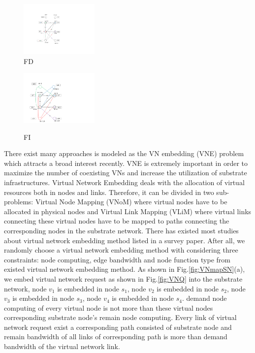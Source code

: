 \begin{figure}
\centering
\begin{minipage}[t]{0.4\linewidth}
\centering
\includegraphics[width=1.5in]{Fig/FD}\\
\caption{ FD}\label{fig:FD}
\end{minipage}
\hfill
\begin{minipage}[t]{0.4\linewidth}
\centering
\includegraphics[width=1.5in]{Fig/FI}\\
\caption{FI}\label{fig:FI}
\end{minipage}
\end{figure}




There exist many approaches is modeled as the VN embedding (VNE) problem which attracts a broad interest recently\cite{fischer2013virtual}. VNE is extremely important in order to maximize the number of coexisting VNs and increase the utilization of substrate infrastructures. Virtual Network Embedding deals with the allocation of virtual resources both in nodes and links. Therefore, it can be divided in two sub-problems: Virtual Node Mapping (VNoM) where virtual nodes have to be allocated in physical nodes and Virtual Link Mapping (VLiM) where virtual links connecting these virtual nodes have to be mapped to paths connecting the
corresponding nodes in the substrate network. There has existed most studies about virtual network embedding method listed in a survey paper\cite{fischer2013virtual}. After all, we randomly choose a virtual network embedding method with considering three constraints: node computing, edge bandwidth and node function type from existed virtual network embedding method. As shown in Fig.\ref{fig:VNmapSN}(a), we embed virtual network request as shown in Fig.\ref{fig:VNQ} into the substrate network, node $v_1$ is embedded in node $s_1$, node $v_2$ is embedded in node $s_2$, node $v_3$ is embedded in node $s_3$, node $v_4$ is embedded in node $s_4$. demand node computing of every virtual node is not more than these virtual nodes corresponding substrate node's remain node computing. Every link of virtual network request exist a corresponding path consisted of substrate node and remain bandwidth of all links of corresponding path is more than demand  bandwidth of the virtual network link.


